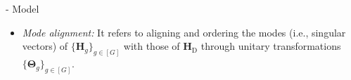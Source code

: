 \documentclass[journal]{IEEEtran}
\begin{document}
\begin{section}{- Model}
\begin{itemize}
		\item \emph{Mode alignment:} It refers to aligning and ordering the modes (i.e., singular vectors) of $\{\mathbf{H}_g\}_{g \in [G]}$ with those of $\mathbf{H}_\mathrm{D}$ through unitary transformations $\{\mathbf{\Theta}_g\}_{g \in [G]}$.

\end{itemize}
\end{section}
\end{document}
